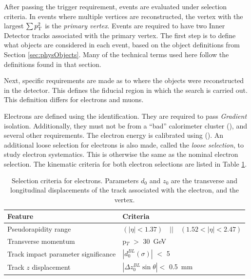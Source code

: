 After passing the trigger requirement, events are evaluated under selection criteria.
In events where multiple vertices are reconstructed, the vertex with the largest $\sum p_\text{T}^2$ is the \emph{primary vertex}.
Events are required to have two Inner Detector tracks associated with the primary vertex.
The first step is to define what objects are considered in each event, based on the object definitions from Section \ref{sec:physObjects}.
Many of the technical terms used here follow the definitions found in that section.

Next, specific requirements are made as to where the objects were reconstructed in the detector. 
This defines the fiducial region in which the search is carried out.
This definition differs for electrons and muons.

Electrons are defined using the  identification.
They are required to pass \emph{Gradient} isolation.
Additionally, they must not be from a ``bad'' calorimeter cluster (), and several other requirements.
The electron energy is calibrated using  ().
An additional loose selection for electrons is also made, called the \emph{loose selection}, to study electron systematics.
This is otherwise the same as the nominal electron selection.
The kinematic criteria for both electron selections are listed in Table \ref{tab:ciElectronSel}.

\begin{table}[!htb]
\caption{Selection criteria for electrons. Parameters $d_{0}$ and $z_{0}$ are the transverse and longitudinal displacements of the track associated with the electron, and the vertex.}
\begin{center}
    \begin{tabular}[ht]{l l}
    \toprule
    Feature & Criteria \\
    \midrule
    Pseudorapidity range & $(|\eta| < 1.37) \quad || \quad (1.52 < |\eta| < 2.47)$ \\
    Transverse momentum & p$_T$ $>$ 30~GeV \\
    Track impact parameter significance & $|d_{0}^{BL}(\sigma)|$ $<$ 5 \\
    Track $z$ displacement & $|\Delta z_{0}^{BL} \sin{\theta}| <$ 0.5~mm \\
    \bottomrule
    \end{tabular}
\end{center}
\label{tab:ciElectronSel}
\end{table}

